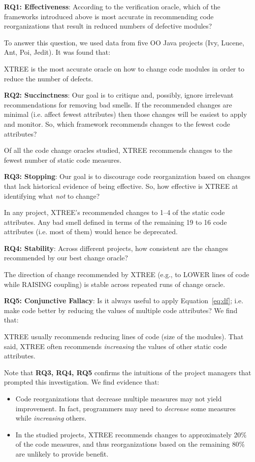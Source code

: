 \documentclass[twocolumn,5p]{elsarticle}
\newcommand{\bi}{\begin{itemize}[leftmargin=0.4cm]}
\newcommand{\ei}{\end{itemize}}
\newcommand{\eq}[1]{Equation~\ref{eq:#1}}
\theoremstyle{break}
\begin{document}
	{\bf  RQ1: Effectiveness}: According to the verification oracle, which of 
	the frameworks introduced above is most accurate in recommending code 
	reorganizations that 
	result in reduced numbers of defective modules?

	To answer this question, we used data from five OO Java projects
	(Ivy, Lucene, Ant, Poi, Jedit). It was found that:
	\begin{lesson}
		XTREE is the most accurate oracle on how to change code modules in 
		order to reduce the number of defects.
	\end{lesson}
	
	{\bf RQ2: Succinctness}: Our goal is to critique and, possibly,
	ignore irrelevant recommendations for removing bad smells.  If the 
	recommended changes are 
	minimal (i.e. affect fewest attributes) then those changes
	will be easiest to apply and monitor. So, which framework recommends 
	changes to the fewest code attributes?
	\begin{lesson}
		Of all the code change oracles studied, XTREE recommends changes to the 
		fewest number of static code measures.
	\end{lesson}
	
	{\bf RQ3: Stopping}: Our goal is to discourage code reorganization based on 
	changes that lack
	historical evidence of being effective. So, how effective is XTREE at 
	identifying what {\em not} to change?
	\begin{lesson}
		In  any  project,  XTREE's  recommended  changes  to 1--4
		of the  static code attributes.  Any bad smell defined in terms of the 
		remaining 19 to 16 code attributes (i.e. most of them)
		would hence be deprecated.
	\end{lesson}
	
	{\bf RQ4: Stability}: Across different projects, how consistent are the 
	changes recommended by our best change oracle?
	\begin{lesson}
		The direction of change recommended by XTREE (e.g., to LOWER lines of 
		code while RAISING coupling) is stable across repeated runs of change 
		oracle.
	\end{lesson}
	
	{\bf RQ5: Conjunctive Fallacy}:
	Is it always  useful  to apply \eq{df}; i.e. make code better by   
	reducing 
	the values of  multiple code attributes? We find that:
	\begin{lesson}
		XTREE usually recommends reducing lines of code (size of the modules).
		That said,  XTREE often recommends {\em increasing} the values of other 
		static code attributes.
	\end{lesson}
	Note that {\bf RQ3, RQ4, RQ5}
	confirms the intuitions
	of the project managers that prompted this investigation. We find evidence 
	that:
	\bi
	\item Code reorganizations that decrease multiple measures may not yield 
	improvement. In fact,  programmers may need to {\em decrease} some 
	measures 
	while {\em increasing} others.
	\item In the studied projects, XTREE recommends changes to approximately 
	20\% of the code measures, and thus reorganizations based on the remaining 
	80\% are unlikely to provide benefit.
	\ei
\end{document}
